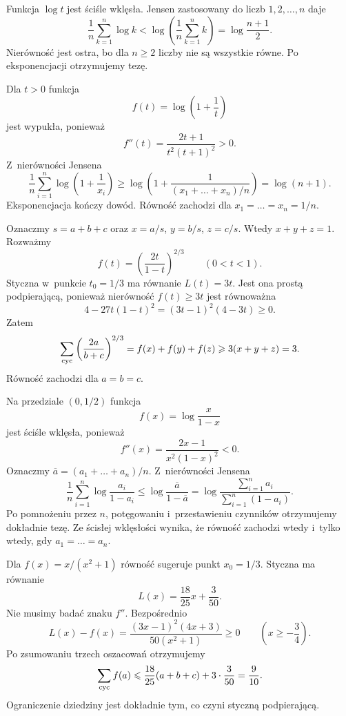 \documentclass{lecture-kuznia}
\begin{document}
\begin{solution*}[\ref{Z6}]
	Funkcja $\log t$ jest ściśle wklęsła. Jensen zastosowany do liczb
	$1,2,\dots,n$ daje
	\[
		\frac1n\sum_{k=1}^n\log k
		<\log\left(\frac1n\sum_{k=1}^n k\right)
		=\log\frac{n+1}{2}.
	\]
	Nierówność jest ostra, bo dla $n\geqslant2$ liczby nie są wszystkie równe.
	Po eksponencjacji otrzymujemy tezę.
\end{solution*}

\begin{solution*}[\ref{Z8}]
	Dla $t>0$ funkcja
	\[
		f(t)=\log\left(1+\frac1t\right)
	\]
	jest wypukła, ponieważ
	\[
		f''(t)=\frac{2t+1}{t^2(t+1)^2}>0.
	\]
	Z~nierówności Jensena
	\[
		\frac1n\sum_{i=1}^n\log\left(1+\frac1{x_i}\right)
		\geqslant
		\log\left(1+\frac1{(x_1+\dots+x_n)/n}\right)
		=\log(n+1).
	\]
	Eksponencjacja kończy dowód. Równość zachodzi dla
	$x_1=\dots=x_n=1/n$.
\end{solution*}

\begin{solution*}[\ref{Z9}]
	Oznaczmy $s=a+b+c$ oraz $x=a/s$, $y=b/s$, $z=c/s$. Wtedy
	$x+y+z=1$. Rozważmy
	\[
		f(t)=\left(\frac{2t}{1-t}\right)^{2/3}
		\qquad(0<t<1).
	\]
	Styczna w~punkcie $t_0=1/3$ ma równanie $L(t)=3t$. Jest ona prostą
	podpierającą, ponieważ nierówność $f(t)\geqslant3t$ jest równoważna
	\[
		4-27t(1-t)^2=(3t-1)^2(4-3t)\geqslant0.
	\]
	Zatem
	\[
		\sum_{\rm cyc}\left(\frac{2a}{b+c}\right)^{2/3}
		=f(x)+f(y)+f(z)\geqslant3(x+y+z)=3.
	\]
	Równość zachodzi dla $a=b=c$.
\end{solution*}

\begin{solution*}[\ref{ZIloczynyJensen}]
	Na przedziale $(0,1/2)$ funkcja
	\[
		f(x)=\log\frac{x}{1-x}
	\]
	jest ściśle wklęsła, ponieważ
	\[
		f''(x)=\frac{2x-1}{x^2(1-x)^2}<0.
	\]
	Oznaczmy $\overline a=(a_1+\dots+a_n)/n$. Z~nierówności Jensena
	\[
		\frac1n\sum_{i=1}^n\log\frac{a_i}{1-a_i}
		\leqslant
		\log\frac{\overline a}{1-\overline a}
		=
		\log\frac{\sum_{i=1}^n a_i}{\sum_{i=1}^n(1-a_i)}.
	\]
	Po pomnożeniu przez $n$, potęgowaniu i~przestawieniu czynników
	otrzymujemy dokładnie tezę. Ze ścisłej wklęsłości wynika, że równość
	zachodzi wtedy i~tylko wtedy, gdy $a_1=\dots=a_n$.
\end{solution*}

\begin{solution*}[\ref{ZE2}]
	Dla $f(x)=x/(x^2+1)$ równość sugeruje punkt $x_0=1/3$. Styczna ma
	równanie
	\[
		L(x)=\frac{18}{25}x+\frac3{50}.
	\]
	Nie musimy badać znaku $f''$. Bezpośrednio
	\[
		L(x)-f(x)
		=\frac{(3x-1)^2(4x+3)}{50(x^2+1)}\geqslant0
		\qquad\left(x\geqslant-\frac34\right).
	\]
	Po zsumowaniu trzech oszacowań otrzymujemy
	\[
		\sum_{\rm cyc}f(a)
		\leqslant\frac{18}{25}(a+b+c)+3\cdot\frac3{50}
		=\frac9{10}.
	\]
	Ograniczenie dziedziny jest dokładnie tym, co czyni styczną podpierającą.
\end{solution*}
\end{document}
